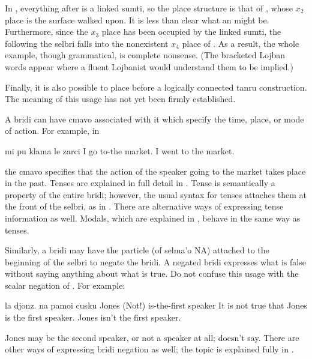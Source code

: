 In , everything after
     is a linked sumti, so the place structure is that of
    , whose $x_2$ place is the surface walked upon. It is
    less than clear what an  might be.
    Furthermore, since the $x_3$ place has been occupied by the linked
    sumti, the  following the selbri falls into the
    nonexistent $x_4$ place of . As a result, the whole
    example, though grammatical, is complete nonsense. (The
    bracketed Lojban words appear where a fluent Lojbanist would
    understand them to be implied.)

Finally, it is also possible to place  before a
     logically connected tanru construction. The
    meaning of this usage has not yet been firmly established.



A bridi can have cmavo associated with it which specify the
    time, place, or mode of action. For example, in
\begin{example}
mi pu klama le zarci\n
I  go to-the market.\n
I went to the market.
\end{example}

{\noindent}the cmavo  specifies that the action of the speaker going
    to the market takes place in the past. Tenses are explained in
    full detail in . Tense is
    semantically a property of the entire bridi; however, the usual
    syntax for tenses attaches them at the front of the selbri, as
    in . There are alternative
    ways of expressing tense information as well. Modals, which are
    explained in , behave in the
    same way as tenses. 

Similarly, a bridi may have the particle  (of selma'o
    NA) attached to the beginning of the selbri to negate the
    bridi. A negated bridi expresses what is false without saying
    anything about what is true. Do not confuse this usage with the
    scalar negation of . For
    example:
\begin{example}
la djonz. na pamoi cusku\n
Jones (Not!) is-the-first speaker\n
It is not true that Jones is the first speaker.\n
Jones isn't the first speaker.
\end{example}

Jones may be the second speaker, or not a speaker at all;  doesn't say. There are other
    ways of expressing bridi negation as well; the topic is
    explained fully in .

